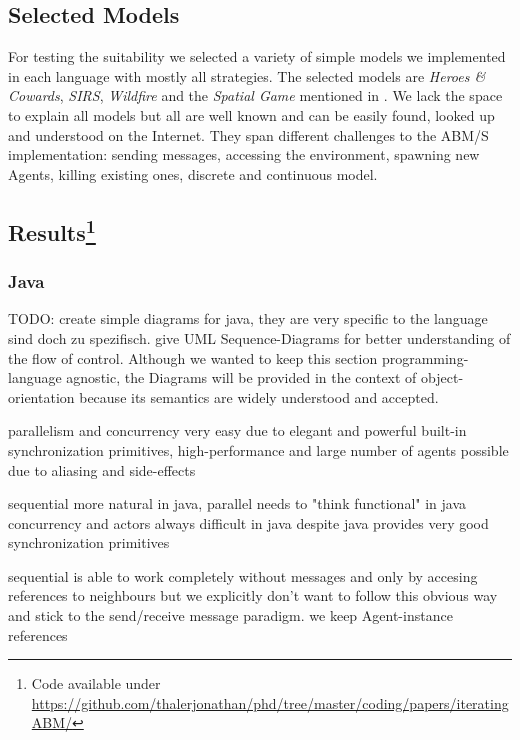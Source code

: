 \subsection{Selected Models}
For testing the suitability we selected a variety of simple models we implemented in each language with mostly all strategies. The selected models are \textit{Heroes \& Cowards}, \textit{SIRS}, \textit{Wildfire} and the \textit{Spatial Game} mentioned in \cite{huberman_evolutionary_1993}. We lack the space to explain all models but all are well known and can be easily found, looked up and understood on the Internet. They span different challenges to the ABM/S implementation: sending messages, accessing the environment, spawning new Agents, killing existing ones, discrete and continuous model.

\subsection[Results]{Results\footnote{Code available under\\ \url{https://github.com/thalerjonathan/phd/tree/master/coding/papers/iteratingABM/}}}

\subsubsection{Java}
TODO: create simple diagrams for java, they are very specific to the language sind doch zu spezifisch.
 give UML Sequence-Diagrams for better understanding of the flow of control. Although we wanted to keep this section programming-language agnostic, the Diagrams will be provided in the context of object-orientation because its semantics are widely understood and accepted.

parallelism and concurrency very easy due to elegant and powerful built-in synchronization primitives, high-performance and large number of agents possible due to aliasing and side-effects

sequential more natural in java,
parallel needs to "think functional" in java
concurrency and actors always difficult in java despite java provides very good synchronization primitives

sequential is able to work completely without messages and only by accesing references to neighbours but we explicitly don't want to follow this obvious way and stick to the send/receive message paradigm. we keep Agent-instance references

